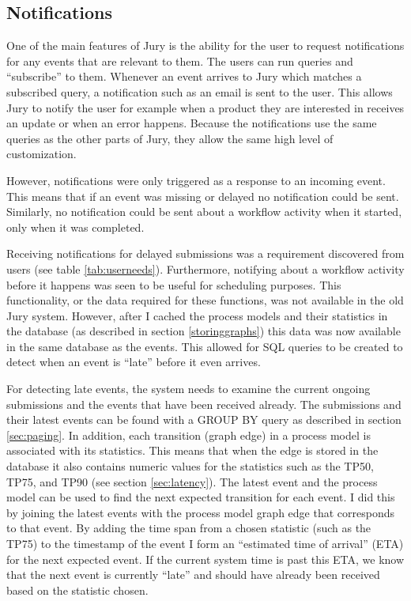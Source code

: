 \subsection{Notifications}
\label{sec:notifications}

One of the main features of Jury is the ability for the user to request notifications for any events that are relevant to them.
The users can run queries and ``subscribe'' to them.
Whenever an event arrives to Jury which matches a subscribed query, a notification such as an email is sent to the user.
This allows Jury to notify the user for example when a product they are interested in receives an update or when an error happens.
Because the notifications use the same queries as the other parts of Jury, they allow the same high level of customization.

However, notifications were only triggered as a response to an incoming event.
This means that if an event was missing or delayed no notification could be sent.
Similarly, no notification could be sent about a workflow activity when it started, only when it was completed.

Receiving notifications for delayed submissions was a requirement discovered from users (see table \ref{tab:userneeds}).
Furthermore, notifying about a workflow activity before it happens was seen to be useful for scheduling purposes.
This functionality, or the data required for these functions, was not available in the old Jury system.
However, after I cached the process models and their statistics in the database (as described in section \ref{storinggraphs}) this data was now available in the same database as the events.
This allowed for SQL queries to be created to detect when an event is ``late'' before it even arrives.

For detecting late events, the system needs to examine the current ongoing submissions and the events that have been received already.
The submissions and their latest events can be found with a GROUP BY query as described in section \ref{sec:paging}.
In addition, each transition (graph edge) in a process model is associated with its statistics. 
This means that when the edge is stored in the database it also contains numeric values for the statistics such as the TP50, TP75, and TP90 (see section \ref{sec:latency}).
The latest event and the process model can be used to find the next expected transition for each event.
I did this by joining the latest events with the process model graph edge that corresponds to that event.
By adding the time span from a chosen statistic (such as the TP75) to the timestamp of the event I form an ``estimated time of arrival'' (ETA) for the next expected event.
If the current system time is past this ETA, we know that the next event is currently ``late'' and should have already been received based on the statistic chosen.

